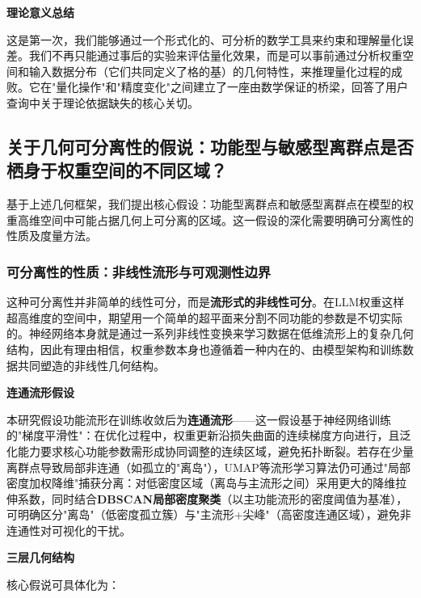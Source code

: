 \documentclass[letterpaper,twocolumn,10pt]{article}
\begin{document}
\textbf{理论意义总结}

这是第一次，我们能够通过一个形式化的、可分析的数学工具来约束和理解量化误差。我们不再只能通过事后的实验来评估量化效果，而是可以事前通过分析权重空间和输入数据分布（它们共同定义了格的基）的几何特性，来推理量化过程的成败。它在"量化操作"和"精度变化"之间建立了一座由数学保证的桥梁，回答了用户查询中关于理论依据缺失的核心关切。

\subsection{关于几何可分离性的假说：功能型与敏感型离群点是否栖身于权重空间的不同区域？}

基于上述几何框架，我们提出核心假设：功能型离群点和敏感型离群点在模型的权重高维空间中可能占据几何上可分离的区域。这一假设的深化需要明确可分离性的性质及度量方法。

\subsubsection{可分离性的性质：非线性流形与可观测性边界}

这种可分离性并非简单的线性可分，而是\textbf{流形式的非线性可分}。在LLM权重这样超高维度的空间中，期望用一个简单的超平面来分割不同功能的参数是不切实际的。神经网络本身就是通过一系列非线性变换来学习数据在低维流形上的复杂几何结构，因此有理由相信，权重参数本身也遵循着一种内在的、由模型架构和训练数据共同塑造的非线性几何结构。

\textbf{连通流形假设}

本研究假设功能流形在训练收敛后为\textbf{连通流形}——这一假设基于神经网络训练的"梯度平滑性"：在优化过程中，权重更新沿损失曲面的连续梯度方向进行，且泛化能力要求核心功能参数需形成协同调整的连续区域，避免拓扑断裂。若存在少量离群点导致局部非连通（如孤立的"离岛"），UMAP等流形学习算法仍可通过"局部密度加权降维"捕获分离：对低密度区域（离岛与主流形之间）采用更大的降维拉伸系数，同时结合\textbf{DBSCAN局部密度聚类}（以主功能流形的密度阈值为基准），可明确区分"离岛"（低密度孤立簇）与"主流形+尖峰"（高密度连通区域），避免非连通性对可视化的干扰。

\textbf{三层几何结构}

核心假说可具体化为：
\end{document}
